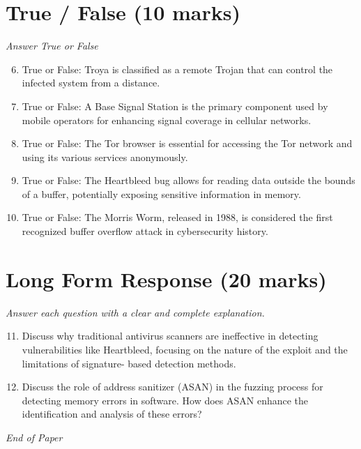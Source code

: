 \documentclass[12pt]{article}
\begin{document}
\section*{True / False (10 marks)}
\textit{Answer True or False}
\begin{enumerate}[label=\arabic*.]
\setcounter{enumi}{5}
\item True or False: Troya is classified as a remote Trojan that can control the infected system from a distance.
\item True or False: A Base Signal Station is the primary component used by mobile operators for enhancing signal coverage in cellular networks.
\item True or False: The Tor browser is essential for accessing the Tor network and using its various services anonymously.
\item True or False: The Heartbleed bug allows for reading data outside the bounds of a buffer, potentially exposing sensitive information in memory.
\item True or False: The Morris Worm, released in 1988, is considered the first recognized buffer overflow attack in cybersecurity history.
\end{enumerate}

\section*{Long Form Response (20 marks)}
\textit{Answer each question with a clear and complete explanation.}
\begin{enumerate}[label=\arabic*.]
\setcounter{enumi}{10}
\item Discuss why traditional antivirus scanners are ineffective in detecting vulnerabilities like Heartbleed, focusing on the nature of the exploit and the limitations of signature- based detection methods.
\item Discuss the role of address sanitizer (ASAN) in the fuzzing process for detecting memory errors in software. How does ASAN enhance the identification and analysis of these errors?
\end{enumerate}

\vfill
\noindent\textit{End of Paper}
\end{document}

